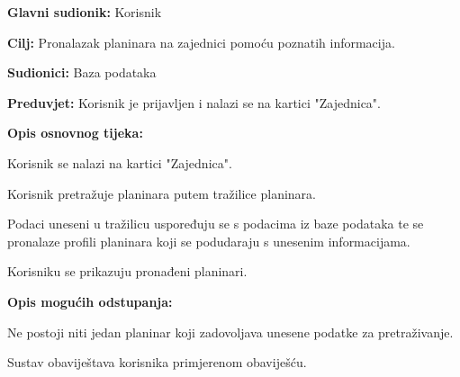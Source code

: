 		\noindent {}
		\begin{packed_item}
			
			\item \textbf{Glavni sudionik: } Korisnik
			\item  \textbf{Cilj:} Pronalazak planinara na zajednici pomoću poznatih informacija.
			\item  \textbf{Sudionici:} Baza podataka
			\item  \textbf{Preduvjet:} Korisnik je prijavljen i nalazi se na kartici "Zajednica".
			\item  \textbf{Opis osnovnog tijeka:}
			
			\item[] \begin{packed_enum}
				
				\item Korisnik se nalazi na kartici "Zajednica".
				\item Korisnik pretražuje planinara putem tražilice planinara.
				\item Podaci uneseni u tražilicu uspoređuju se s podacima iz baze podataka te se pronalaze profili planinara koji se podudaraju s unesenim informacijama.
				\item Korisniku se prikazuju pronađeni planinari.
				
			\end{packed_enum}
			
			\item  \textbf{Opis mogućih odstupanja:}
			
			\item[] \begin{packed_item}
					
					\item[3.a] Ne postoji niti jedan planinar koji zadovoljava unesene podatke za pretraživanje.
					\item[] \begin{packed_enum}
						
						\item Sustav obaviještava korisnika primjerenom obaviješću.
					\end{packed_enum}
				
				
			\end{packed_item}
		\end{packed_item}
		
